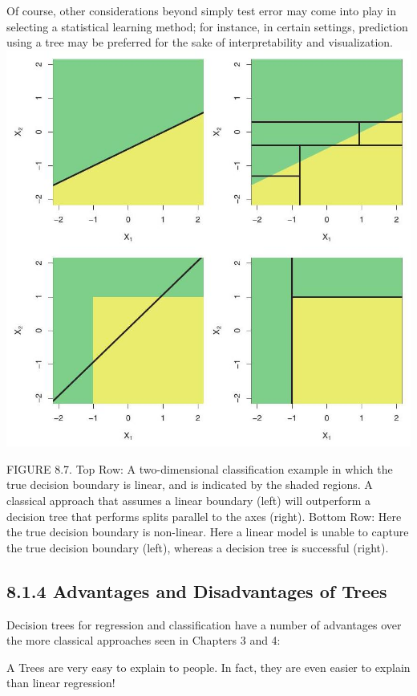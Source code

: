 \documentclass[10pt]{article}
\begin{document}
Of course, other considerations beyond simply test error may come into play in selecting a statistical learning method; for instance, in certain settings, prediction using a tree may be preferred for the sake of interpretability and visualization.\\
\includegraphics[max width=\textwidth, center]{2025_05_05_efe77898333945044de4g-330}

FIGURE 8.7. Top Row: A two-dimensional classification example in which the true decision boundary is linear, and is indicated by the shaded regions. A classical approach that assumes a linear boundary (left) will outperform a decision tree that performs splits parallel to the axes (right). Bottom Row: Here the true decision boundary is non-linear. Here a linear model is unable to capture the true decision boundary (left), whereas a decision tree is successful (right).

\subsection*{8.1.4 Advantages and Disadvantages of Trees}
Decision trees for regression and classification have a number of advantages over the more classical approaches seen in Chapters 3 and 4:

A Trees are very easy to explain to people. In fact, they are even easier to explain than linear regression!
\end{document}
